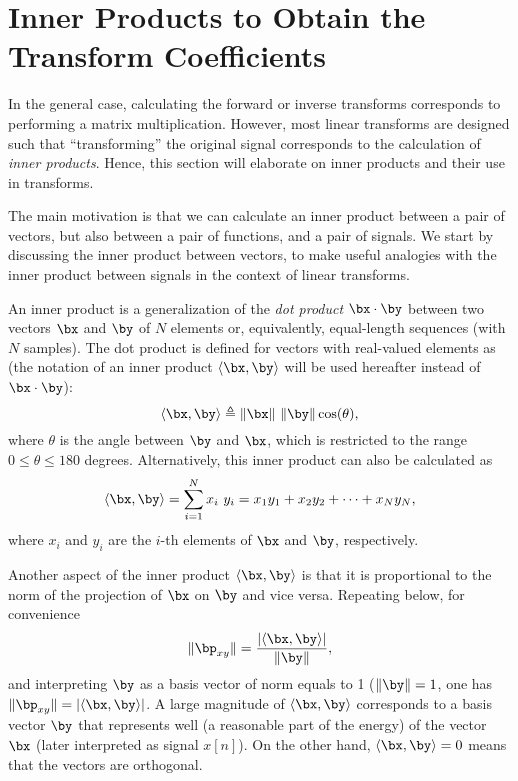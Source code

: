 \section{{\akadvanced} Inner Products to Obtain the Transform Coefficients}
\label{sec:innerProductsForTransforms}

In the general case, calculating the forward or inverse transforms corresponds to performing a matrix multiplication. However, most linear transforms are designed such that ``transforming'' the original signal corresponds to the calculation of \emph{inner products}.
Hence, this section will elaborate on inner products and their use in transforms.

The main motivation is that we
can calculate an inner product between a pair of vectors, but also between a pair of functions, and a pair of signals. 
We start by discussing the inner product between vectors, to make useful analogies with the inner product between signals in the context of linear transforms.

An inner product is a generalization of the \emph{dot product} $\bx \cdot\by$ between two vectors $\bx$ and $\by$ of $N$ elements or, equivalently, equal-length sequences (with $N$ samples). The dot product is defined for vectors with real-valued elements as (the notation of an inner product $\langle\bx,\by\rangle$ will be used hereafter instead of $\bx \cdot\by$):
\begin{equation}
\langle\bx,\by\rangle \triangleq \lVert\bx\rVert~\lVert\by\rVert \cos(\theta),
\label{eq:dot_product_geometric}
\end{equation}
where $\theta$ is the angle between $\by$ and $\bx$, which is restricted to the range $0 \le \theta \le 180$ degrees. Alternatively, this inner product can also be calculated as
\begin{equation}
\langle\bx,\by\rangle = \sum_{i=1}^N x_i \textrm{~} y_i = x_1 y_1 + x_2 y_2 + \cdots + x_N y_N,
\label{eq:dot_product}
\end{equation}
where $x_i$ and $y_i$ are the $i$-th elements of $\bx$ and $\by$, respectively.

Another aspect of the inner product $\langle\bx,\by\rangle$ is that it is proportional to the norm of the projection of $\bx$ on $\by$ and vice versa. 
Repeating  below, for convenience
\begin{equation}
\lVert\bp_{xy}\rVert= \frac{| \langle\bx,\by\rangle |}{\lVert\by\rVert},
\end{equation}
and interpreting $\by$ as a basis vector of norm equals to 1 ($\lVert\by\rVert=1$, one has $\lVert\bp_{xy}\rVert= | \langle\bx,\by\rangle |$.
A large magnitude of $\langle\bx,\by\rangle$ corresponds to a basis vector $\by$ that represents well (a reasonable part of the energy) of the vector $\bx$
(later interpreted as signal $x[n]$). On the other hand, $\langle\bx,\by\rangle = 0$ means that the vectors are orthogonal.

